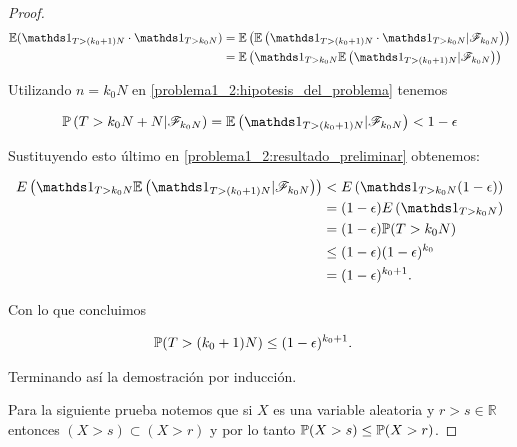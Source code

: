 \begin{proof}
	\begin{align} 
		\E(\indic_{T>(k_0+1)N} \cdot \indic_{T>k_0N}) 	&=		\E\left(\E\left(\indic_{T>(k_0+1)N} \cdot \indic_{T>k_0N} | \F_{k_0N}\right)\right) \\ 
														&=		\E\left(\indic_{T>k_0N} \E\left(\indic_{T>(k_0+1)N}|\F_{k_0N}\right)\right) \label{problema1_2:resultado_preliminar}
	\end{align}\par\null
    
	Utilizando  $n=k_0N$ en \eqref{problema1_2:hipotesis_del_problema} tenemos
    
	\begin{align}
		\mw\left(T>k_0N+N|\F_{k_0N}\right) = \E\left(\indic_{T>(k_0+1)N}|\F_{k_0N}\right) < 1-\epsilon
	\end{align}\par\null
    
	Sustituyendo esto último en \eqref{problema1_2:resultado_preliminar} obtenemos:
    
    \begin{align}
             E\left(\indic_{T>k_0N} \E\left(\indic_{T>(k_0+1)N}|\F_{k_0N}\right)\right) 	&< 		E\left(\indic_{T>k_0N} (1-\epsilon)\right) \\
                                                                                            &=	 	(1-\epsilon) E\left(\indic_{T>k_0N} \right) \\
                                                                                            &=		(1-\epsilon) \mw(T>k_0N) \\
                                                                                            &\leq   (1-\epsilon)(1-\epsilon)^{k_0} \\
                                                                                            &= (1-\epsilon)^{k_0 + 1}.
    \end{align}\par\null
        
	Con lo que concluimos
    
    \begin{align}
        \mathbb{P}(T>(k_0+1)N) &\leq (1-\epsilon)^{k_0 + 1}.
    \end{align}\par\null
        
	Terminando así la demostración por inducción.\par\null
	
	
	Para la siguiente prueba notemos que si $X$ es una variable aleatoria y $r > s \in \mathbb{R}$ entonces
	$(X > s) \subset (X > r)$ y por lo tanto $\mathbb{P}(X > s) \leq \mathbb{P}(X > r)$.\par\null
	

\end{proof}
